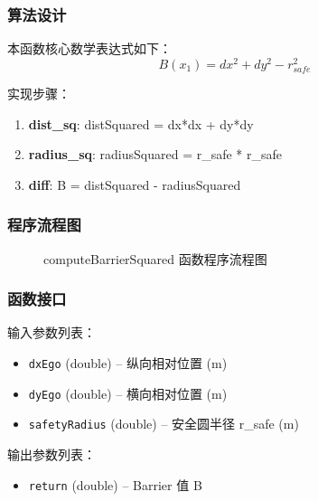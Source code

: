 \documentclass[a4paper,10pt]{article}
\begin{document}
\subsubsection{算法设计}
\par 本函数核心数学表达式如下：
\begin{equation}
B(x_1) = dx^2 + dy^2 - r_{safe}^2
\end{equation}
\par 实现步骤：
\begin{enumerate}
  \item \textbf{dist\_sq}: distSquared = dx*dx + dy*dy
  \item \textbf{radius\_sq}: radiusSquared = r\_safe * r\_safe
  \item \textbf{diff}: B = distSquared - radiusSquared
\end{enumerate}
\subsubsection{程序流程图}
\begin{figure}[h]
    \centering
    \caption{computeBarrierSquared 函数程序流程图}
    \label{fig:flow_computeBarrierSquared}
\end{figure}
\subsubsection{函数接口}
\par 输入参数列表：
\begin{itemize}
  \item \texttt{dxEgo} (double) -- 纵向相对位置 (m)
  \item \texttt{dyEgo} (double) -- 横向相对位置 (m)
  \item \texttt{safetyRadius} (double) -- 安全圆半径 r\_safe (m)
\end{itemize}
\par 输出参数列表：
\begin{itemize}
  \item \texttt{return} (double) -- Barrier 值 B
\end{itemize}
\end{document}
